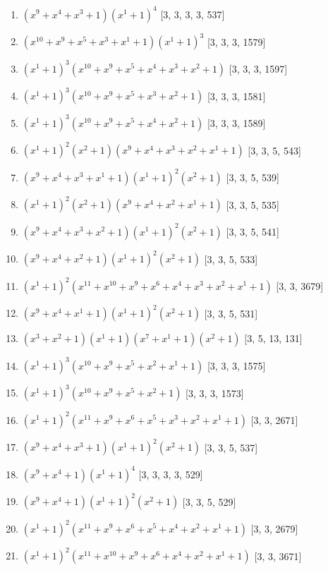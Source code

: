 \documentclass[10pt,twocolumn]{article}
\begin{document}
\begin{enumerate}
\item $(x^{9} + x^{4} + x^{3} + 1)(x^{1} + 1)^{4}$  [3, 3, 3, 3, 537]
\item $(x^{10} + x^{9} + x^{5} + x^{3} + x^{1} + 1)(x^{1} + 1)^{3}$  [3, 3, 3, 1579]
\item $(x^{1} + 1)^{3}(x^{10} + x^{9} + x^{5} + x^{4} + x^{3} + x^{2} + 1)$  [3, 3, 3, 1597]
\item $(x^{1} + 1)^{3}(x^{10} + x^{9} + x^{5} + x^{3} + x^{2} + 1)$  [3, 3, 3, 1581]
\item $(x^{1} + 1)^{3}(x^{10} + x^{9} + x^{5} + x^{4} + x^{2} + 1)$  [3, 3, 3, 1589]
\item $(x^{1} + 1)^{2}(x^{2} + 1)(x^{9} + x^{4} + x^{3} + x^{2} + x^{1} + 1)$  [3, 3, 5, 543]
\item $(x^{9} + x^{4} + x^{3} + x^{1} + 1)(x^{1} + 1)^{2}(x^{2} + 1)$  [3, 3, 5, 539]
\item $(x^{1} + 1)^{2}(x^{2} + 1)(x^{9} + x^{4} + x^{2} + x^{1} + 1)$  [3, 3, 5, 535]
\item $(x^{9} + x^{4} + x^{3} + x^{2} + 1)(x^{1} + 1)^{2}(x^{2} + 1)$  [3, 3, 5, 541]
\item $(x^{9} + x^{4} + x^{2} + 1)(x^{1} + 1)^{2}(x^{2} + 1)$  [3, 3, 5, 533]
\item $(x^{1} + 1)^{2}(x^{11} + x^{10} + x^{9} + x^{6} + x^{4} + x^{3} + x^{2} + x^{1} + 1)$  [3, 3, 3679]
\item $(x^{9} + x^{4} + x^{1} + 1)(x^{1} + 1)^{2}(x^{2} + 1)$  [3, 3, 5, 531]
\item $(x^{3} + x^{2} + 1)(x^{1} + 1)(x^{7} + x^{1} + 1)(x^{2} + 1)$  [3, 5, 13, 131]
\item $(x^{1} + 1)^{3}(x^{10} + x^{9} + x^{5} + x^{2} + x^{1} + 1)$  [3, 3, 3, 1575]
\item $(x^{1} + 1)^{3}(x^{10} + x^{9} + x^{5} + x^{2} + 1)$  [3, 3, 3, 1573]
\item $(x^{1} + 1)^{2}(x^{11} + x^{9} + x^{6} + x^{5} + x^{3} + x^{2} + x^{1} + 1)$  [3, 3, 2671]
\item $(x^{9} + x^{4} + x^{3} + 1)(x^{1} + 1)^{2}(x^{2} + 1)$  [3, 3, 5, 537]
\item $(x^{9} + x^{4} + 1)(x^{1} + 1)^{4}$  [3, 3, 3, 3, 529]
\item $(x^{9} + x^{4} + 1)(x^{1} + 1)^{2}(x^{2} + 1)$  [3, 3, 5, 529]
\item $(x^{1} + 1)^{2}(x^{11} + x^{9} + x^{6} + x^{5} + x^{4} + x^{2} + x^{1} + 1)$  [3, 3, 2679]
\item $(x^{1} + 1)^{2}(x^{11} + x^{10} + x^{9} + x^{6} + x^{4} + x^{2} + x^{1} + 1)$  [3, 3, 3671]

\end{enumerate}
\end{document}
